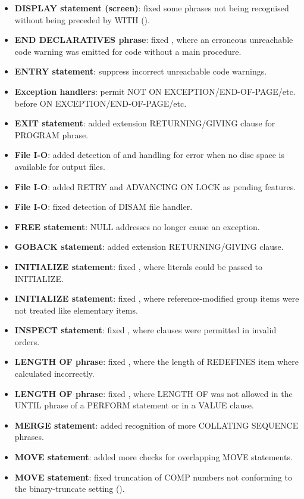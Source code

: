 \begin{itemize}
\item \textbf{DISPLAY statement (screen)}: fixed some phrases not being recognised without being preceded by WITH ().
\item \textbf{END DECLARATIVES phrase}: fixed , where an erroneous unreachable code warning was emitted for code without a main procedure.
\item \textbf{ENTRY statement}: suppress incorrect unreachable code warnings.
\item \textbf{Exception handlers}: permit NOT ON EXCEPTION\slash{}END-OF-PAGE\slash{}etc. before ON EXCEPTION\slash{}END-OF-PAGE\slash{}etc.
\item \textbf{EXIT statement}: added extension RETURNING\slash{}GIVING clause for PROGRAM phrase.
\item \textbf{File I-O}: added detection of and handling for error when no disc space is available for output files.
\item \textbf{File I-O}: added RETRY and ADVANCING ON LOCK as pending features.
\item \textbf{File I-O}: fixed detection of DISAM file handler.
\item \textbf{FREE statement}: NULL addresses no longer cause an exception.
\item \textbf{GOBACK statement}: added extension RETURNING\slash{}GIVING clause.
\item \textbf{INITIALIZE statement}: fixed , where literals could be passed to INITIALIZE.
\item \textbf{INITIALIZE statement}: fixed , where reference-modified group items were not treated like elementary items.
\item \textbf{INSPECT statement}: fixed , where clauses were permitted in invalid orders.
\item \textbf{LENGTH OF phrase}: fixed , where the length of REDEFINES item where calculated incorrectly.
\item \textbf{LENGTH OF phrase}: fixed , where LENGTH OF was not allowed in the UNTIL phrase of a PERFORM statement or in a VALUE clause.
\item \textbf{MERGE statement}: added recognition of more COLLATING SEQUENCE phrases.
\item \textbf{MOVE statement}: added more checks for overlapping MOVE statements.
\item \textbf{MOVE statement}: fixed truncation of COMP numbers not conforming to the binary-truncate setting ().

\end{itemize}

